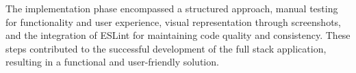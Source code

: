 The implementation phase encompassed a structured approach, manual testing for functionality and user experience, visual representation through screenshots, and the integration of ESLint for maintaining code quality and consistency. These steps contributed to the successful development of the full stack application, resulting in a functional and user-friendly solution.
